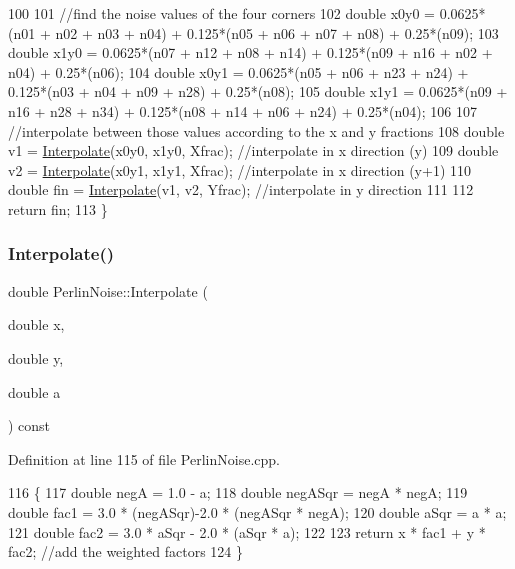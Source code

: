 \begin{DoxyCode}
100 
101     \textcolor{comment}{//find the noise values of the four corners}
102     \textcolor{keywordtype}{double} x0y0 = 0.0625*(n01 + n02 + n03 + n04) + 0.125*(n05 + n06 + n07 + n08) + 0.25*(n09);
103     \textcolor{keywordtype}{double} x1y0 = 0.0625*(n07 + n12 + n08 + n14) + 0.125*(n09 + n16 + n02 + n04) + 0.25*(n06);
104     \textcolor{keywordtype}{double} x0y1 = 0.0625*(n05 + n06 + n23 + n24) + 0.125*(n03 + n04 + n09 + n28) + 0.25*(n08);
105     \textcolor{keywordtype}{double} x1y1 = 0.0625*(n09 + n16 + n28 + n34) + 0.125*(n08 + n14 + n06 + n24) + 0.25*(n04);
106 
107     \textcolor{comment}{//interpolate between those values according to the x and y fractions}
108     \textcolor{keywordtype}{double} v1 = \mbox{\hyperlink{class_perlin_noise_ac4a0870388edd44e14caca983bd018aa}{Interpolate}}(x0y0, x1y0, Xfrac); \textcolor{comment}{//interpolate in x direction (y)}
109     \textcolor{keywordtype}{double} v2 = \mbox{\hyperlink{class_perlin_noise_ac4a0870388edd44e14caca983bd018aa}{Interpolate}}(x0y1, x1y1, Xfrac); \textcolor{comment}{//interpolate in x direction (y+1)}
110     \textcolor{keywordtype}{double} fin = \mbox{\hyperlink{class_perlin_noise_ac4a0870388edd44e14caca983bd018aa}{Interpolate}}(v1, v2, Yfrac);  \textcolor{comment}{//interpolate in y direction}
111 
112     \textcolor{keywordflow}{return} fin;
113 \}
\end{DoxyCode}
\mbox{\label{class_perlin_noise_ac4a0870388edd44e14caca983bd018aa}} 
\subsubsection{\texorpdfstring{Interpolate()}{Interpolate()}}
{\footnotesize\ttfamily double Perlin\+Noise\+::\+Interpolate (\begin{DoxyParamCaption}\item[{double}]{x,  }\item[{double}]{y,  }\item[{double}]{a }\end{DoxyParamCaption}) const\hspace{0.3cm}{\ttfamily [private]}}



Definition at line 115 of file Perlin\+Noise.\+cpp.


\begin{DoxyCode}
116 \{
117     \textcolor{keywordtype}{double} negA = 1.0 - a;
118     \textcolor{keywordtype}{double} negASqr = negA * negA;
119     \textcolor{keywordtype}{double} fac1 = 3.0 * (negASqr)-2.0 * (negASqr * negA);
120     \textcolor{keywordtype}{double} aSqr = a * a;
121     \textcolor{keywordtype}{double} fac2 = 3.0 * aSqr - 2.0 * (aSqr * a);
122 
123     \textcolor{keywordflow}{return} x * fac1 + y * fac2; \textcolor{comment}{//add the weighted factors}
124 \}
\end{DoxyCode}
\mbox{\label{class_perlin_noise_a40cedf54fffebae57229216cd1b2c880}} 

